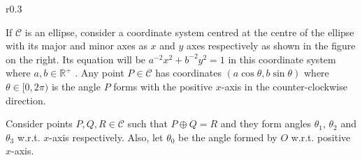 \begin{wrapfigure}{r}{0.3\textwidth}
    \centering

    \caption{}
\end{wrapfigure}

If $\mathcal{C}$ is an ellipse, consider a coordinate system centred at the centre of the
ellipse with its major and minor axes as $x$ and $y$ axes respectively as shown in
the figure on the right. Its equation will be
$a^{-2} x^2 + b^{-2} y^2 = 1$ in this coordinate system where
$a,b\in\mathbb{R}^+$ . Any point $P \in \mathcal{C}$ has coordinates
$(a \cos \theta, b \sin \theta)$ where $\theta \in [0,2\pi)$ is the angle $P$
forms with the positive $x$-axis in the counter-clockwise direction.
\vspace{1ex}

Consider points $P,Q,R \in \mathcal{C}$ such that $P \oplus Q = R$ and they form angles
$\theta_1$, $\theta_2$ and $\theta_3$ w.r.t. $x$-axis respectively. Also, let
$\theta_0$ be the angle formed by $O$ w.r.t. positive $x$-axis.
\vspace{1ex}

